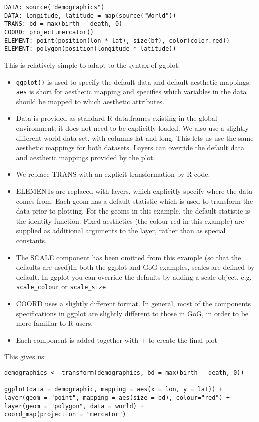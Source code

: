 \begin{verbatim}
DATA: source("demographics")
DATA: longitude, latitude = map(source("World"))
TRANS: bd = max(birth - death, 0)
COORD: project.mercator()
ELEMENT: point(position(lon * lat), size(bf), color(color.red))
ELEMENT: polygon(position(longitude * latitude))
\end{verbatim}

This is relatively simple to adapt to the syntax of ggplot:

\begin{itemize}
  
  \item {\tt ggplot()} is used to specify the default data and default aesthetic mappings.  {\tt aes} is short for aesthetic mapping and specifies which variables in the data should be mapped to which aesthetic attributes.
  
  \item Data is provided as standard R data.frames existing in the global environment; it does not need to be explicitly loaded.  We also use a slightly different world data set, with columns lat and long.  This lets us use the same aesthetic mappings for both datasets. Layers can override the default data and aesthetic mappings provided by the plot. 
  
  \item We replace {\sf TRANS} with an explicit transformation by R code.

  \item {\sf ELEMENT}s are replaced with layers, which explicitly specify where the data comes from.  Each geom has a default statistic which is used to transform the data prior to plotting.  For the geoms in this example, the default statistic is the identity function.  Fixed aesthetics (the colour red in this example) are supplied as additional arguments to the layer, rather than as special constants.

  \item The {\sf SCALE} component has been omitted from this example (so that the defaults are used)In both the ggplot and GoG examples, scales are defined by default.  In ggplot you can override the defaults by adding a scale object, e.g. {\tt scale\_colour} or {\tt scale\_size}

  \item {\sf COORD} uses a slightly different format.  In general, most of the components specifications in ggplot are slightly different to those in GoG, in order to be more familiar to R users.

  \item Each component is added together with $+$ to create the final plot

\end{itemize}

This gives us:

\begin{verbatim}
demographics <- transform(demographics, bd = max(birth - death, 0))

ggplot(data = demographic, mapping = aes(x = lon, y = lat)) + 
layer(geom = "point", mapping = aes(size = bd), colour="red") +
layer(geom = "polygon", data = world) +
coord_map(projection = "mercator")
\end{verbatim}
